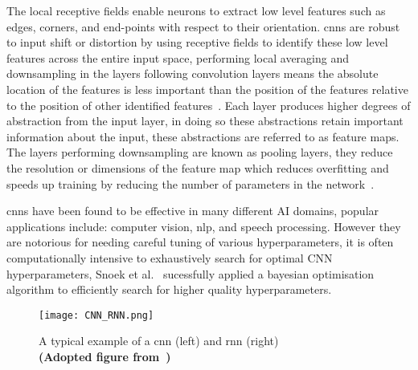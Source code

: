 \documentclass[../../D1.tex]{subfiles}
\begin{document}
The local receptive fields enable neurons to extract low level features such as edges, corners, and end-points with respect to their orientation. 
\Acrshort{cnn}s are robust to input shift or distortion by using receptive fields to identify these low level features across the entire input space, performing local averaging and downsampling in the layers following convolution layers means the absolute location of the features is less important than the position of the features relative to the position of other identified features~\autocite{lecunConvolutionalNetworksImages}. 
Each layer produces higher degrees of abstraction from the input layer, in doing so these abstractions retain important information about the input, these abstractions are referred to as feature maps.
The layers performing downsampling are known as pooling layers, they reduce the resolution or dimensions of the feature map which reduces overfitting and speeds up training by reducing the number of parameters in the network~\autocite{pouyanfarSurveyDeepLearning2019}.


\acrshort{cnn}s have been found to be effective in many different AI domains, popular applications include: computer vision, \Acrshort{nlp}, and speech processing. 
However they are notorious for needing careful tuning of various hyperparameters, it is often computationally intensive to exhaustively search for optimal CNN hyperparameters, Snoek et al.~\autocite{snoekPracticalBayesianOptimization2012} sucessfully applied a bayesian optimisation algorithm to efficiently search for higher quality hyperparameters.

\begin{figure}
    \texttt{[image: CNN\_RNN.png]} 
    \caption{A typical example of a \acrshort*{cnn} (left) and \acrshort{rnn} (right)\\ \textbf{(Adopted figure from~\autocite{chenDeepLearningMobile2020})}}
    \label{fig:exampleCnnRnn}   
\end{figure}
\end{document}
